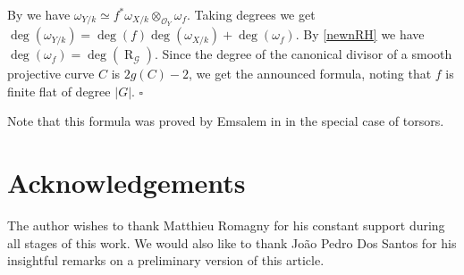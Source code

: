 \documentclass{amsart}
\newenvironment{demo}{{\flushleft \bf Proof~:}}{\hfill $\square$ \vspace{5mm}}
\theoremstyle{definition}
\theoremstyle{remark}
\begin{document}
\begin{demo}

By \cite[6.4, Lemma 4.26]{Liu} we have $\omega_{Y/k} \simeq f^*\omega_{X/k} \otimes_{{{\mathcal O}}_Y} \omega_f$. Taking degrees we get $\deg(\omega_{Y/k}) = \deg(f) \deg(\omega_{X/k}) + \deg(\omega_f)$. By \ref{newnRH} we have $\deg(\omega_f) = \deg(\operatorname{R}_{{\mathcal G}})$.  Since the degree of the canonical divisor of a smooth projective curve $C$ is $2g(C)-2$, we get the announced formula, noting that $f$ is finite flat of degree $\vert G \vert$. 
\end{demo}

Note that this formula was proved by Emsalem in \cite[cor. 7.3]{emsalem} in the special case of torsors.

\medskip

\section*{Acknowledgements}

The author wishes to thank Matthieu Romagny for his constant support during all stages of this work. We would also like to thank Jo\~ao Pedro Dos Santos for his insightful remarks on a preliminary version of this article.


 

 
 
\end{document}
